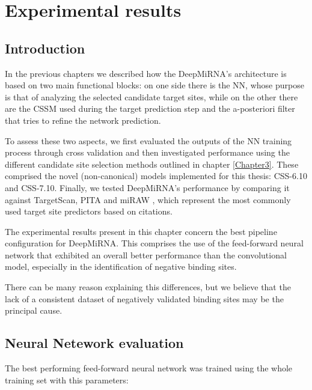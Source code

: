 
\chapter{Experimental results} %

\label{Chapter5} %

\section{Introduction}
In the previous chapters we described how the DeepMiRNA's architecture is based on two main functional blocks: on one side there is the NN, whose purpose is that of analyzing the selected candidate target sites, while on the other there are the CSSM used during the target prediction step and the a-posteriori filter that tries to refine the network prediction. 

To assess these two aspects, we first evaluated the outputs of the NN training process through cross validation and then investigated performance using the different candidate site selection methods outlined in chapter \ref{Chapter3}. These comprised the novel (non-canonical) models implemented for this thesis: CSS-6.10 and CSS-7.10. Finally, we tested DeepMiRNA’s performance by comparing it against TargetScan\cite{targetscan}, PITA\cite{accessibility_nrg_role} and miRAW \cite{miraw}, which represent the most commonly used target site predictors based on citations.

The experimental results present in this chapter concern the best pipeline configuration for DeepMiRNA. This comprises the use of the feed-forward neural network that exhibited an overall better performance than the convolutional model, especially in the identification of negative binding sites. 

There can be many reason explaining this differences, but we believe that the lack of a consistent dataset of negatively validated binding sites may be the principal cause. 

\section{Neural Netework evaluation}
The best performing feed-forward neural network was trained using the whole training set with this parameters:

